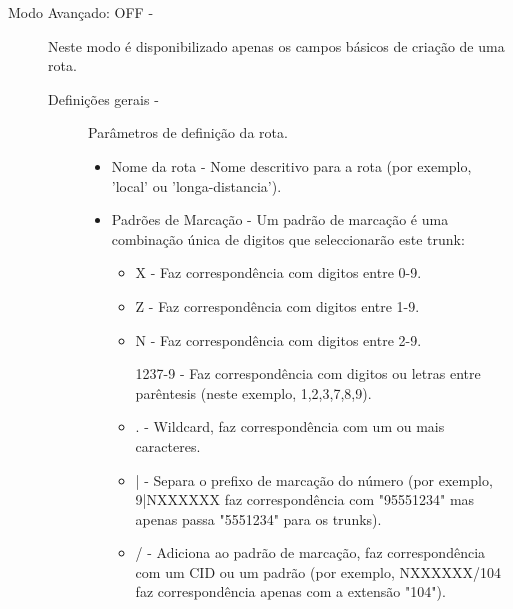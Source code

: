 \begin{description}
	\item[Modo Avançado: OFF -] Neste modo é disponibilizado apenas os campos básicos de criação de uma rota.
        \begin{description}
            \item[Definições gerais -] Parâmetros de definição da rota.
                \begin{itemize}
                    \item Nome da rota - Nome descritivo para a rota (por exemplo, 'local' ou 'longa-distancia').
                    \item Padrões de Marcação - Um padrão de marcação é uma combinação única de digitos que seleccionarão este trunk:
                        \begin{itemize}
                            \item X - Faz correspondência com digitos entre 0-9.
                            \item Z - Faz correspondência com digitos entre 1-9.
                            \item N - Faz correspondência com digitos entre 2-9.
                            \item [1237-9] - Faz correspondência com digitos ou letras entre parêntesis (neste exemplo, 1,2,3,7,8,9).
                            \item . - Wildcard, faz correspondência com um ou mais caracteres.
                            \item | - Separa o prefixo de marcação do número (por exemplo, 9|NXXXXXX faz correspondência com "95551234" mas apenas passa "5551234" para os trunks).
                            \item / - Adiciona ao padrão de marcação, faz correspondência com um CID ou um padrão (por exemplo, NXXXXXX/104 faz correspondência apenas com a extensão "104").
                        \end{itemize}                                            
                \end{itemize}


\end{description}
\end{description}
